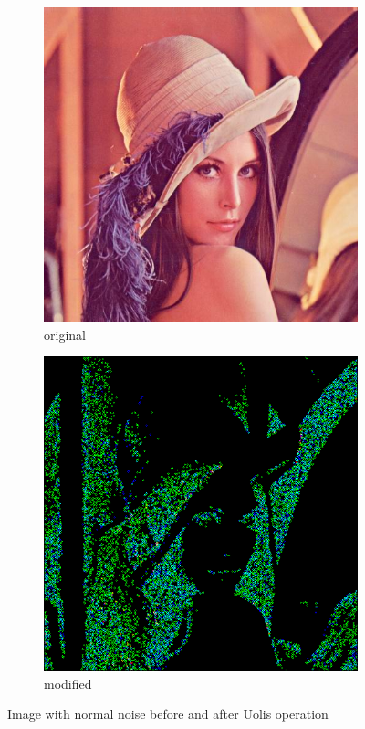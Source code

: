\documentclass[12pt]{article}
\begin{document}
\begin{figure}[H]\centering
    \begin{subfigure}[t]{\subfiguresize}\centering
        \includegraphics[width=\textwidth]{lenac.png}
        \caption{original}
    \end{subfigure}
    \hspace{.05\textwidth}
    \begin{subfigure}[t]{\subfiguresize}\centering
        \includegraphics[width=\textwidth]{lena_uolis_normal.png}
        \caption{modified}
    \end{subfigure}
    \caption{Image with normal noise before and after Uolis operation}
\end{figure}
\end{document}

